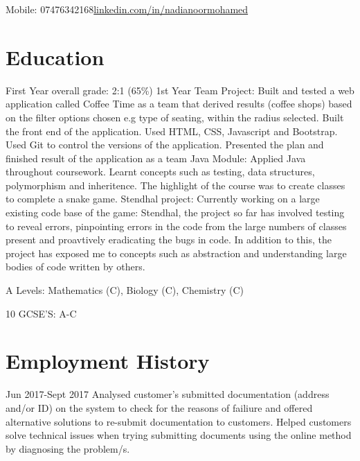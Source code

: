 \documentclass{my_cv}
\begin{document}
{Mobile: 07476342168}\url{linkedin.com/in/nadianoormohamed}{}

\section{Education}


\workitemSix
{First Year overall grade: 2:1 (65\%)}
{1st Year Team Project:  
Built and tested a web application called Coffee Time as a team that derived results (coffee shops) based on the filter options chosen e.g type of seating, within the radius selected.}
{Built the front end of the application. Used HTML, CSS, Javascript and Bootstrap. Used Git to control the versions of the application.}
{Presented the plan and finished result of the application as a team}
{Java Module: Applied Java throughout coursework. Learnt concepts such as testing, data structures, polymorphism and inheritence. The highlight of the course was to create classes to complete a snake game.}
{Stendhal project: Currently working on a large existing code base of the game: Stendhal, the project so far has involved testing to reveal errors, pinpointing errors in the code from the large numbers of classes present and proavtively eradicating the bugs in code. In addition to this, the project has exposed me to concepts such as abstraction and understanding large bodies of code written by others.}


\workitemOne
{A Levels: Mathematics (C), Biology (C), Chemistry (C)
}


\workitemOne
{10 GCSE'S: A-C
}




\section{Employment History}

{Jun 2017-Sept 2017}
\workitemTwo
{Analysed customer's submitted documentation (address and/or ID) on the system to check for the reasons of failiure and offered alternative solutions to re-submit documentation to customers. 
}
{Helped customers solve technical issues when trying submitting documents using the online method by diagnosing the problem/s.}
\end{document}
